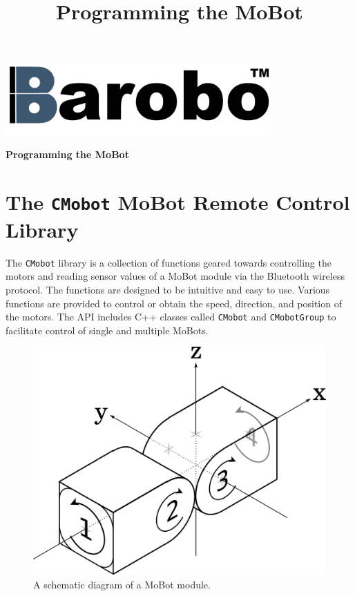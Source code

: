 \documentclass{article}
\title{Programming the MoBot}
\begin{document}
\begin{center}
\includegraphics[width=4in]{images/Barobo.png}
\end{center}
\begin{center}
\vspace*{1.5cm}
{\Huge\sf\bf Programming the MoBot}
\end{center}
\bigskip
\tableofcontents
\section{The \texttt{CMobot} MoBot Remote Control Library}
The \texttt{CMobot} library is a collection of functions geared towards
controlling the motors and reading sensor values of a MoBot module via the
Bluetooth wireless protocol. The functions are designed to be intuitive
and easy to use. Various functions are provided to control or obtain the speed,
direction, and position of the motors. The API includes C++ classes called
\texttt{CMobot} and \texttt{CMobotGroup} to facilitate control of 
single and multiple MoBots.

\begin{figure}[H]
\begin{center}
\includegraphics[width=4.5in]{images/joint_diagram_verbose.png}
\end{center}
\caption{\label{fig:joint_diagram_verbose.png} A schematic diagram of a MoBot module.}
\end{figure}
\end{document}
